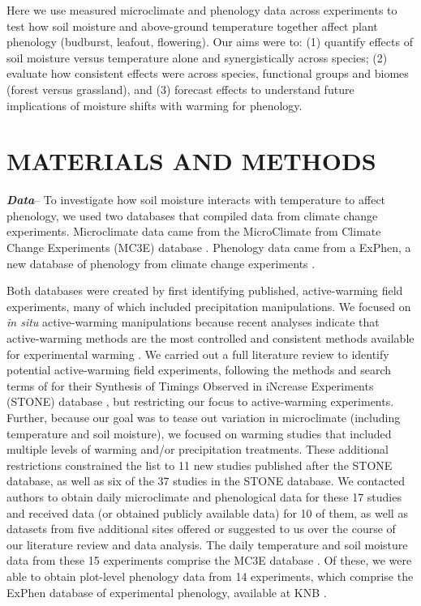 \documentclass{article}
\begin{document}
\par Here we use measured microclimate and phenology data across experiments to test how soil moisture and above-ground temperature together affect plant phenology (budburst, leafout, flowering). Our aims were to: (1) quantify effects of soil moisture versus temperature alone and synergistically across species; (2) evaluate how consistent effects were across species, functional groups and biomes (forest versus grassland), and (3) forecast effects to understand future implications of moisture shifts with warming for phenology. 

\section* {MATERIALS AND METHODS}
\textbf {\emph{Data}}-- To investigate how soil moisture interacts with temperature to affect phenology, we used two databases that compiled data from climate change experiments. Microclimate data came from the MicroClimate from Climate Change Experiments (MC3E) database \citep{ettinger2018, ettinger2019}. Phenology data came from a ExPhen, a new database of phenology from climate change experiments \citep{ettinger2022}. 

\par Both databases were created by first identifying published, active-warming field experiments, many of which included precipitation manipulations. We focused on \textit{in situ} active-warming manipulations because recent analyses indicate that active-warming methods are the most controlled and consistent methods available for experimental warming \citep{kimball2005,kimball2008,aronson2009,wolkovich2012a}. We carried out a full literature review to identify potential active-warming field experiments, following the methods and search terms of \citet{wolkovich2012a} for their Synthesis of Timings Observed in iNcrease Experiments (STONE) database \citep{wolkovich2012}, but restricting our focus to active-warming experiments. Further, because our goal was to tease out variation in microclimate (including temperature and soil moisture), we focused on warming studies that included multiple levels of warming and/or precipitation treatments. These additional restrictions constrained the list to 11 new studies published after the STONE database, as well as six of the 37 studies in the STONE database. We contacted authors to obtain daily microclimate and phenological data for these 17 studies and received data (or obtained publicly available data) for 10 of them, as well as datasets from five additional sites offered or suggested to us over the course of our literature review and data analysis. The daily temperature and soil moisture data from these 15 experiments comprise the MC3E database \citep{ettinger2018,ettinger2019}. Of these, we were able to obtain plot-level phenology data from 14 experiments, which comprise the ExPhen database of experimental phenology, available at KNB \citep{ettinger2022}. 
\end{document}
